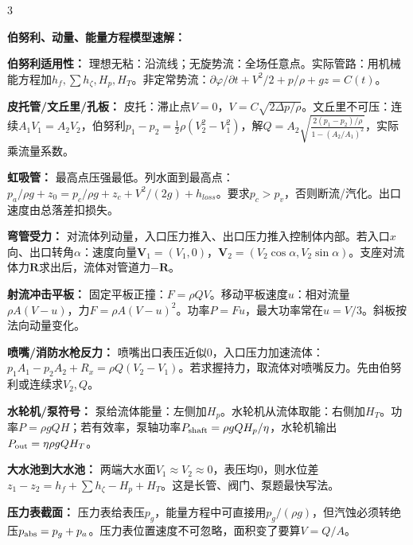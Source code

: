 \documentclass[a4paper]{article}
\newcommand{\sect}[1]{\par{\bfseries\color{Q}#1：}}
\begin{document}
\begin{multicols}{3}
{\sect{伯努利、动量、能量方程模型速解}
\sect{伯努利适用性}
理想无粘：沿流线；无旋势流：全场任意点。实际管路：用机械能方程加$h_f,\sum h_\zeta,H_p,H_T$。非定常势流：$\partial\varphi/\partial t+V^2/2+p/\rho+gz=C(t)$。
\sect{皮托管/文丘里/孔板}
皮托：滞止点$V=0$，$V=C\sqrt{2\Delta p/\rho}$。文丘里不可压：连续$A_1V_1=A_2V_2$，伯努利$p_1-p_2=\frac12\rho(V_2^2-V_1^2)$，解$Q=A_2\sqrt{\frac{2(p_1-p_2)/\rho}{1-(A_2/A_1)^2}}$，实际乘流量系数。
\sect{虹吸管}
最高点压强最低。列水面到最高点：$p_a/\rho g+z_0=p_c/\rho g+z_c+V^2/(2g)+h_{loss}$。要求$p_c>p_v$，否则断流/汽化。出口速度由总落差扣损失。
\sect{弯管受力}
对流体列动量，入口压力推入、出口压力推入控制体内部。若入口$x$向、出口转角$\alpha$：速度向量$\bm V_1=(V_1,0)$，$\bm V_2=(V_2\cos\alpha,V_2\sin\alpha)$。支座对流体力$\bm R$求出后，流体对管道力$-\bm R$。
\sect{射流冲击平板}
固定平板正撞：$F=\rho QV$。移动平板速度$u$：相对流量$\rho A(V-u)$，力$F=\rho A(V-u)^2$。功率$P=Fu$，最大功率常在$u=V/3$。斜板按法向动量变化。
\sect{喷嘴/消防水枪反力}
喷嘴出口表压近似0，入口压力加速流体：$p_1A_1-p_2A_2+R_x=\rho Q(V_2-V_1)$。若求握持力，取流体对喷嘴反力。先由伯努利或连续求$V_2,Q$。
\sect{水轮机/泵符号}
泵给流体能量：左侧加$H_p$。水轮机从流体取能：右侧加$H_T$。功率$P=\rho gQH$；若有效率，泵轴功率$P_{\rm shaft}=\rho gQH_p/\eta$，水轮机输出$P_{\rm out}=\eta\rho gQH_T$。
\sect{大水池到大水池}
两端大水面$V_1\approx V_2\approx0$，表压均0，则水位差$z_1-z_2=h_f+\sum h_\zeta-H_p+H_T$。这是长管、阀门、泵题最快写法。
\sect{压力表截面}
压力表给表压$p_g$，能量方程中可直接用$p_g/(\rho g)$，但汽蚀必须转绝压$p_{\rm abs}=p_g+p_a$。压力表位置速度不可忽略，面积变了要算$V=Q/A$。

}
\end{multicols}
\end{document}
